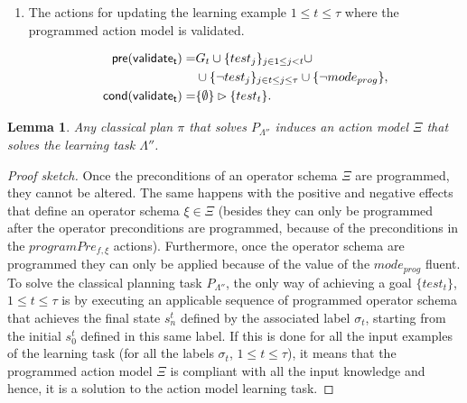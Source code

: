 \documentclass[letterpaper]{article} %
\newcommand{\pre}{\mathsf{pre}}     %
\newcommand{\cond}{\mathsf{cond}}   %
\newtheorem{lemma}[theorem]{Lemma}
\begin{document}
\begin{itemize}
\begin{enumerate}
\item The actions for updating the learning example {\tt\small $1\leq t\leq \tau$} where the programmed action model is validated. 
\begin{small}
\begin{align*}
\hspace*{7pt}\pre(\mathsf{validate_{t}})=&G_t\cup\{test_j\}_{j\in 1\leq j<t}\cup\\
&\cup\{\neg test_j\}_{j\in t\leq j\leq \tau}\cup \{\neg mode_{prog}\},\\
\cond(\mathsf{validate_{t}})=&\{\emptyset\}\rhd\{test_t\}.
\end{align*}
\end{small}
\end{enumerate}
\end{itemize}


\begin{lemma}
Any classical plan $\pi$ that solves $P_{\Lambda''}$ induces an action model $\Xi$ that solves the learning task $\Lambda''$.
\end{lemma}

\begin{proof}[Proof sketch]
Once the preconditions of an operator schema $\Xi$ are programmed, they cannot be altered. The same happens with the positive and negative effects that define an operator schema $\xi \in \Xi$ (besides they can only be programmed after the operator preconditions are programmed, because of the preconditions in the $programPre_{f,\xi}$ actions). Furthermore, once the operator schema are programmed they can only be applied because of the value of the $mode_{prog}$ fluent. To solve the classical planning task $P_{\Lambda''}$, the only way of achieving a goal $\{test_t\}$,{\small $1\leq t\leq \tau$} is by executing an applicable sequence of programmed operator schema that achieves the final state $s_n^t$ defined by the associated label $\sigma_t$, starting from the initial $s_0^t$ defined in this same label. If this is done for all the input examples of the learning task (for all the labels $\sigma_t$, {\small $1\leq t\leq \tau$}), it means that the programmed action model $\Xi$ is compliant with all the input knowledge and hence, it is a solution to the action model learning task.
\end{proof}
\end{document}
